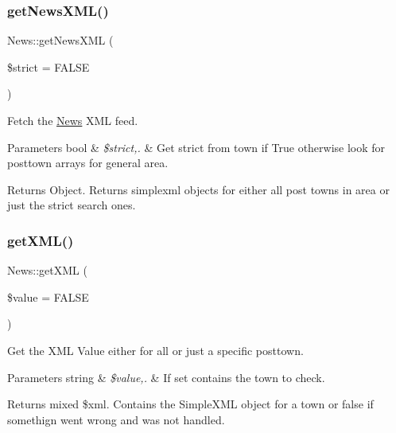 \subsubsection{\texorpdfstring{get\+News\+X\+M\+L()}{getNewsXML()}}
{\footnotesize\ttfamily News\+::get\+News\+X\+ML (\begin{DoxyParamCaption}\item[{}]{\$strict = {\ttfamily FALSE} }\end{DoxyParamCaption})}



Fetch the \hyperlink{class_news}{News} X\+ML feed. 


\begin{DoxyParams}[1]{Parameters}
bool & {\em \$strict,.} & Get strict from town if True otherwise look for posttown arrays for general area.\\
\hline
\end{DoxyParams}
\begin{DoxyReturn}{Returns}
Object. Returns simplexml objects for either all post towns in area or just the strict search ones. 
\end{DoxyReturn}
\hypertarget{class_news_aa9f1517421b0c0ecaeb992a00c3c37a8}{}\label{class_news_aa9f1517421b0c0ecaeb992a00c3c37a8} 
\subsubsection{\texorpdfstring{get\+X\+M\+L()}{getXML()}}
{\footnotesize\ttfamily News\+::get\+X\+ML (\begin{DoxyParamCaption}\item[{}]{\$value = {\ttfamily FALSE} }\end{DoxyParamCaption})\hspace{0.3cm}{\ttfamily [private]}}



Get the X\+ML Value either for all or just a specific posttown. 


\begin{DoxyParams}[1]{Parameters}
string & {\em \$value,.} & If set contains the town to check.\\
\hline
\end{DoxyParams}
\begin{DoxyReturn}{Returns}
mixed \$xml. Contains the Simple\+X\+ML object for a town or false if somethign went wrong and was not handled. 
\end{DoxyReturn}
\hypertarget{class_news_a002eef91ca7d8590faf45d61b84539c0}{}\label{class_news_a002eef91ca7d8590faf45d61b84539c0} 
